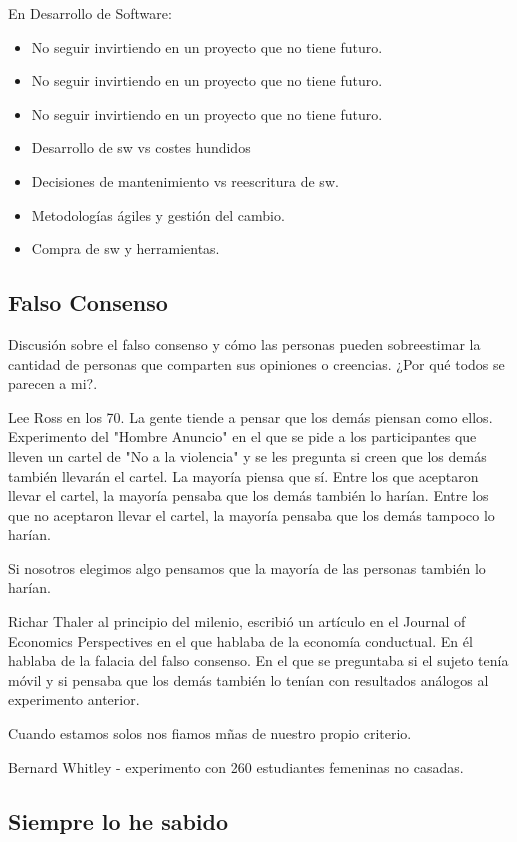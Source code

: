 \documentclass[12pt, a4paper, twoside]{article}
\begin{document}
\newpage
En Desarrollo de Software:
\begin{itemize}
    \item No seguir invirtiendo en un proyecto que no tiene futuro.
    \item No seguir invirtiendo en un proyecto que no tiene futuro.
    \item No seguir invirtiendo en un proyecto que no tiene futuro.
    \item Desarrollo de sw vs costes hundidos
    \item Decisiones de mantenimiento vs reescritura de sw.
    \item Metodologías ágiles y gestión del cambio.
    \item Compra de sw y herramientas.
\end{itemize}


\subsection{Falso Consenso}

Discusión sobre el falso consenso y cómo las personas pueden sobreestimar la cantidad de personas que comparten sus opiniones o creencias.
¿Por qué todos se parecen a mi?.

Lee Ross en los 70. La gente tiende a pensar que los demás piensan como ellos.
Experimento del "Hombre Anuncio" en el que se pide a los participantes que lleven un cartel de "No a la violencia" y se les pregunta si creen que los demás también llevarán el cartel. La mayoría piensa que sí.
Entre los que aceptaron llevar el cartel, la mayoría pensaba que los demás también lo harían.
Entre los que no aceptaron llevar el cartel, la mayoría pensaba que los demás tampoco lo harían.

Si nosotros elegimos algo pensamos que la mayoría de las personas también lo harían.

Richar Thaler al principio del milenio, escribió un artículo en el Journal of Economics Perspectives en el que hablaba de la economía conductual. En él hablaba de la falacia del falso consenso.
En el que se preguntaba si el sujeto tenía móvil y si pensaba que los demás también lo tenían con resultados análogos al experimento anterior.  

Cuando estamos solos nos fiamos mñas de nuestro propio criterio.

Bernard Whitley - experimento con 260 estudiantes femeninas no casadas.



\subsection{Siempre lo he sabido}
\end{document}
